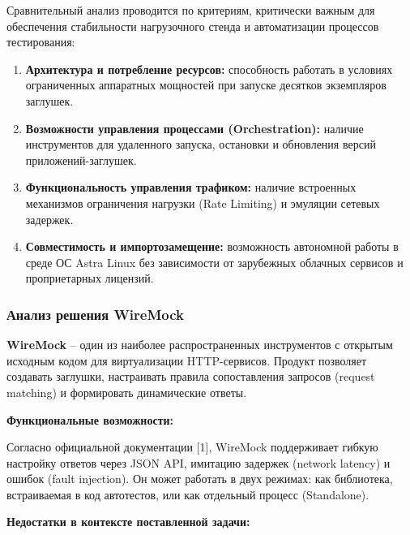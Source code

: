 \documentclass[
]{article}
\begin{document}
Сравнительный анализ проводится по критериям, критически важным для
обеспечения стабильности нагрузочного стенда и автоматизации процессов
тестирования:

\begin{enumerate}
\def\labelenumi{\arabic{enumi}.}
\item
  \textbf{Архитектура и потребление ресурсов:} способность работать в
  условиях ограниченных аппаратных мощностей при запуске десятков
  экземпляров заглушек.
\item
  \textbf{Возможности управления процессами (Orchestration):} наличие
  инструментов для удаленного запуска, остановки и обновления версий
  приложений-заглушек.
\item
  \textbf{Функциональность управления трафиком:} наличие встроенных
  механизмов ограничения нагрузки (Rate Limiting) и эмуляции сетевых
  задержек.
\item
  \textbf{Совместимость и импортозамещение:} возможность автономной
  работы в среде ОС Astra Linux без зависимости от зарубежных облачных
  сервисов и проприетарных лицензий.
\end{enumerate}

\subsubsection{Анализ решения
WireMock}\label{ux430ux43dux430ux43bux438ux437-ux440ux435ux448ux435ux43dux438ux44f-wiremock}

\textbf{WireMock} -- один из наиболее распространенных инструментов с
открытым исходным кодом для виртуализации HTTP-сервисов. Продукт
позволяет создавать заглушки, настраивать правила сопоставления запросов
(request matching) и формировать динамические ответы.

\textbf{Функциональные возможности:}

Согласно официальной документации {[}1{]}, WireMock поддерживает гибкую
настройку ответов через JSON API, имитацию задержек (network latency) и
ошибок (fault injection). Он может работать в двух режимах: как
библиотека, встраиваемая в код автотестов, или как отдельный процесс
(Standalone).

\textbf{Недостатки в контексте поставленной задачи:}
\end{document}

